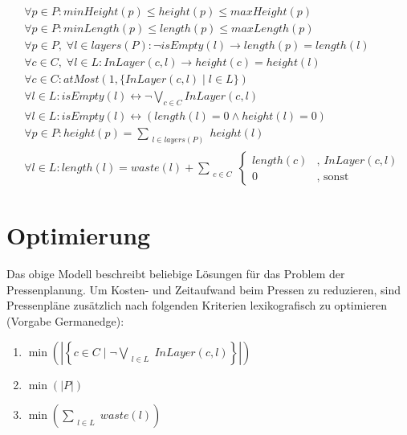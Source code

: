 \begin{align}
    & \forall p \in P: minHeight(p) \leq height(p) \leq maxHeight(p) \\[10pt]
    & \forall p \in P: minLength(p) \leq length(p) \leq maxLength(p) \\[10pt]
    & \forall p \in P,\; \forall l \in layers(P): \neg isEmpty(l) \rightarrow length(p) = length(l) \\[10pt]
    & \forall c \in C,\; \forall l \in L: InLayer(c,l) \rightarrow height(c) = height(l) \\[10pt]
    & \forall c \in C: atMost(1,\{ InLayer(c,l) \mid l \in L \}) \\[10pt]
    & \forall l \in L: isEmpty(l) \leftrightarrow \neg\bigvee_{c \in C} InLayer(c,l) \\[10pt]
    & \forall l \in L: isEmpty(l) \leftrightarrow (length(l) = 0 \land height(l) = 0) \\[10pt]
    & \forall p \in P: height(p) = \sum_{\substack{l \in layers(P)}} height(l)  \\[10pt]
    & \forall l \in L: length(l) = waste(l) + \sum_{\substack{c \in C}}
    \begin{cases}
        length(c) & \text{, } InLayer(c,l) \\
        0 & \text{, sonst}
    \end{cases}
\end{align}

\section{Optimierung}
Das obige Modell beschreibt beliebige Lösungen für das Problem der Pressenplanung.
Um Kosten- und Zeitaufwand beim Pressen zu reduzieren, sind Pressenpläne zusätzlich nach folgenden Kriterien lexikografisch zu optimieren (Vorgabe Germanedge):
\begin{enumerate}
    \item $ \min \left( \left\lvert \left\{ c \in C \mid \neg\bigvee\limits_{\substack{l \in L}} InLayer(c,l) \right\} \right\rvert \right) $
    \item $ \min (\lvert P \rvert) $
    \item $ \min \left(\sum\limits_{\substack{l \in L}} waste(l) \right) $
\end{enumerate}
